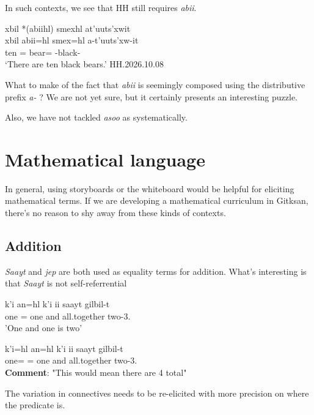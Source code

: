 \documentclass{article}
\begin{document}
In such contexts, we see that HH still requires \textit{abii}.

\begin{exe}
    \ex \glll xbil *(abiihl) smexhl at'uuts'xwit \\
    xbil abii=hl smex=hl a-t'uuts'xw-it \\
    ten  \Cnt{}=\Cn{} bear=\Cn{} \Distr{}-black-\Sx{}   \\
    `There are ten black bears.' \hfill HH.2026.10.08
\end{exe}

What to make of the fact that \textit{abii} is seemingly composed using the distributive prefix \textit{a-} \parencite[368]{bicevskisQuantificationGitksan2017}? We are not yet sure, but it certainly presents an interesting puzzle.

Also, we have not tackled \textit{asoo} as systematically. 

\section{Mathematical language}
In general, using storyboards or the whiteboard would be helpful for eliciting mathematical terms. If we are developing a mathematical curriculum in Gitksan, there's no reason to shy away from these kinds of contexts.

\subsection{Addition}
\textit{Saayt} and \textit{jep} are both used as equality terms for addition. What's interesting is that \textit{Saayt} is not self-referrential
\begin{exe}
\ex \begin{xlist}
\item k'i an=hl k'i ii saayt gilbil-t\\
 one \Pcnj{}=\Cn{} one and all.together two-3.\Ii{}\\
'One and one is two'
\item \gll k'i=hl an=hl k'i ii saayt gilbil-t\\
one=\Cn{} \Pcnj{}=\Cn{} one and all.together two-3.\Ii{}\\
\textbf{Comment}: "This would mean there are 4 total"
\end{xlist}
\end{exe}
The variation in connectives needs to be re-elicited with more precision on where the predicate is.
\end{document}
